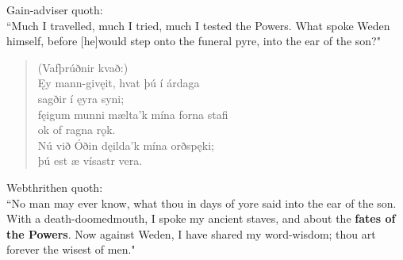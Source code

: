 \bvb Gain-adviser quoth: \\ “Much I travelled, much I tried, much I tested the Powers. What spoke Weden himself, before [he]\footnotemark[115] would step onto the funeral pyre, into the ear of the son?" \\

\begin{verse}
(Vafþrúðnir kvað:) \\%
\bva Ęy mann-gi\footnotemark[40] vęit, \hld hvat þú í árdaga \\%
\ind sagðir í ęyra syni; \\%
fęigum munni \hld mælta'k mína forna stafi \\%
\ind ok of ragna rǫk. \\%
Nú við Óðin \hld dęilda'k mína orðspęki; \\%
\ind þú est æ vísastr vera.\\%
\end{verse}

\bvb Webthrithen quoth: \\ “No man may ever know\footnotemark[119], what thou in days of yore said into the ear of the son. With a death-doomed\footnotemark[120] mouth, I spoke my ancient staves, and about the \textbf{fates of the Powers}\footnotemark[121]. Now against Weden, I have shared my word-wisdom\footnotemark[122]; thou art forever the wisest of men\footnotemark[123]." \\

